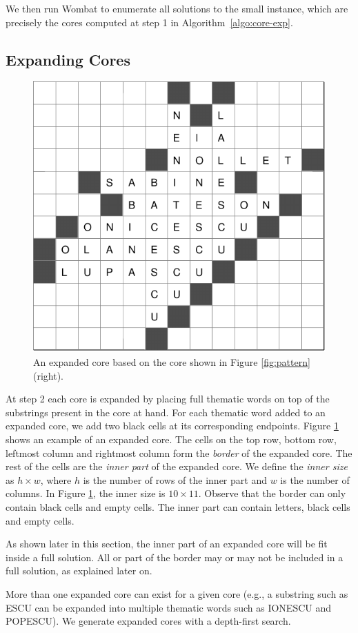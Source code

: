 We then run {\sc Wombat} to enumerate all solutions to the small instance, which are precisely the 
cores computed at step 1 in Algorithm~\ref{algo:core-exp}.



\subsection{Expanding Cores}

\begin{figure}
\centering
\includegraphics[width=.45\textwidth]{_plots/extcore-alive-0-puzzle-72-2975-1488--1--1.pdf}
\caption{An expanded core based on the core shown in Figure \ref{fig:pattern} (right).}
\label{fig:exp-core}
\end{figure}


At step 2 each core is expanded by placing full thematic words on top of the substrings present in the core at hand.
For each thematic word added to an expanded core, we add two black cells at its corresponding endpoints.
Figure \ref{fig:exp-core} shows an example of an expanded core. 
The cells on the top row, bottom row, leftmost column and rightmost column form the \emph{border} of the expanded core. The rest of the cells are the \emph{inner part} of the expanded core.
We define the \emph{inner size} as $h \times w$, where $h$ is the number of rows
of the inner part and $w$ is the number of columns.
In Figure \ref{fig:exp-core}, the inner size is $10 \times 11$.
Observe that the border can only contain black cells and empty cells.
The inner part can contain letters, black cells and empty cells.

As shown later in this section, the inner part of an expanded core will be fit inside a full solution.
All or part of the border may or may not be included in a full solution, as explained later on.

More than one expanded core can exist for a given core (e.g., a substring such as {\sf\small ESCU} can be expanded into multiple thematic words such as {\sf\small IONESCU} and {\sf\small POPESCU}).
We generate expanded cores with a depth-first search.

